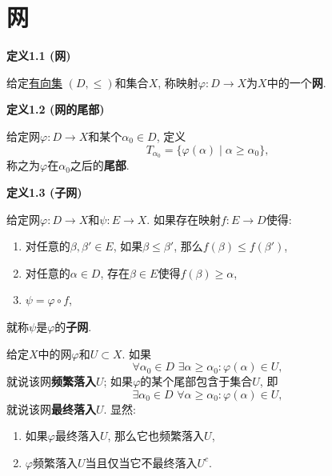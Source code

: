 \documentclass[UTF8]{ctexart}
\begin{document}
\setlength{\abovedisplayskip}{1pt}
\setlength{\belowdisplayskip}{1pt}

\section{网}

\hypertarget{sec:定义1.1}{}
\noindent\textbf{定义1.1 (网)}

给定\href{../../01 基础集合论/04 序理论/01 序关系/01 预序关系#nameddest=sec:定义2.1}{有向集}
$(D,\leqslant)$和集合$X$, 称映射$\varphi:D\to X$为$X$中的一个\textbf{网}.

\vspace{10pt}

\hypertarget{sec:定义1.2}{}
\noindent\textbf{定义1.2 (网的尾部)}

给定网$\varphi:D\to X$和某个$\alpha_0\in D$, 定义
\[
    T_{\alpha_0}=\{\varphi(\alpha)\mid\alpha\geqslant\alpha_0\},
\]
称之为$\varphi$在$\alpha_0$之后的\textbf{尾部}.

\vspace{10pt}

\hypertarget{sec:定义1.3}{}
\noindent\textbf{定义1.3 (子网)}

给定网$\varphi:D\to X$和$\psi:E\to X$. 如果存在映射$f:E\to D$使得:
\begin{enumerate}
    \item 对任意的$\beta,\beta'\in E$, 如果$\beta\leqslant\beta'$,
    那么$f(\beta)\leqslant f(\beta')$,
    \item 对任意的$\alpha\in D$, 存在$\beta\in E$使得$f(\beta)\geqslant\alpha$,
    \item $\psi=\varphi\circ f$,
\end{enumerate}
就称$\psi$是$\varphi$的\textbf{子网}.

\vspace{10pt}

给定$X$中的网$\varphi$和$U\subset X$. 如果
\[
    \forall\alpha_0\in D\,\,\exists\alpha\geqslant\alpha_0:\varphi(\alpha)\in U,
\]
就说该网\textbf{频繁落入}$U$; 如果$\varphi$的某个尾部包含于集合$U$, 即
\[
    \exists\alpha_0\in D\,\,\forall\alpha\geqslant\alpha_0:\varphi(\alpha)\in U,
\]
就说该网\textbf{最终落入}$U$. 显然:
\begin{enumerate}
    \item 如果$\varphi$最终落入$U$, 那么它也频繁落入$U$,
    \item $\varphi$频繁落入$U$当且仅当它不最终落入$U^c$.
\end{enumerate}
\end{document}
